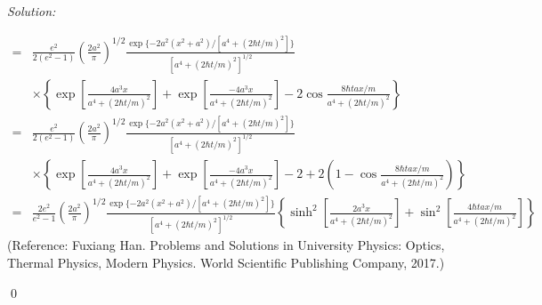 \documentclass[12pt]{article}
\newenvironment{sol}
    {\emph{Solution:}
    }
    {
    \qed
    }
\begin{document}
\begin{sol}
\begin{align}
\nonumber=&\frac{e^2}{2(e^2-1)}(\frac{2a^2}{\pi})^{1/2}\frac{\exp\{-2a^2(x^2+a^2)/[a^4+(2\hbar t/m)^2]\}}{[a^4+(2\hbar t/m)^2]^{1/2}}\\
\nonumber&\times\left\{\exp\left[\frac{4a^3x}{a^4+(2\hbar t/m)^2}\right]+\exp\left[\frac{-4a^3x}{a^4+(2\hbar t/m)^2}\right]-2\cos\frac{8\hbar tax/m}{a^4+(2\hbar t/m)^2}\right\}\\
\nonumber=&\frac{e^2}{2(e^2-1)}(\frac{2a^2}{\pi})^{1/2}\frac{\exp\{-2a^2(x^2+a^2)/[a^4+(2\hbar t/m)^2]\}}{[a^4+(2\hbar t/m)^2]^{1/2}}\\
\nonumber&\times\left\{\exp\left[\frac{4a^3x}{a^4+(2\hbar t/m)^2}\right]+\exp\left[\frac{-4a^3x}{a^4+(2\hbar t/m)^2}\right]-2+2(1-\cos\frac{8\hbar tax/m}{a^4+(2\hbar t/m)^2})\right\}\\
=&\frac{2e^2}{e^2-1}(\frac{2a^2}{\pi})^{1/2}\frac{\exp\{-2a^2(x^2+a^2)/[a^4+(2\hbar t/m)^2]\}}{[a^4+(2\hbar t/m)^2]^{1/2}}\left\{\sinh^2\left[\frac{2a^3x}{a^4+(2\hbar t/m)^2}\right]+\sin^2\left[\frac{4\hbar tax/m}{a^4+(2\hbar t/m)^2}\right]\right\}
\end{align}
\footnotesize(Reference: Fuxiang Han. Problems and Solutions in University Physics: Optics, Thermal Physics, Modern Physics. World Scientific Publishing Company, 2017.)\normalsize
\end{sol}
\end{document}
